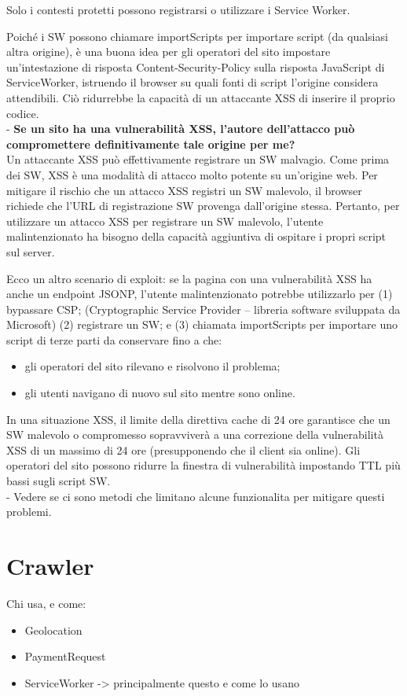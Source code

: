 \documentclass[italian]{article}
\begin{document}
\begin{itemize}
Solo i contesti protetti possono registrarsi o utilizzare i Service Worker.

Poiché i SW possono chiamare importScripts per importare script (da qualsiasi altra origine), è una buona idea per gli operatori del sito impostare un'intestazione di risposta Content-Security-Policy sulla risposta JavaScript di ServiceWorker, istruendo il browser su quali fonti di script l'origine considera attendibili. Ciò ridurrebbe la capacità di un attaccante XSS di inserire il proprio codice.
\\
-
\textbf{Se un sito ha una vulnerabilità XSS, l'autore dell'attacco può compromettere definitivamente tale origine per me?}
\\
Un attaccante XSS può effettivamente registrare un SW malvagio. Come prima dei SW, XSS è una modalità di attacco molto potente su un'origine web. Per mitigare il rischio che un attacco XSS registri un SW malevolo, il browser richiede che l'URL di registrazione SW provenga dall'origine stessa. Pertanto, per utilizzare un attacco XSS per registrare un SW malevolo, l'utente malintenzionato ha bisogno della capacità aggiuntiva di ospitare i propri script sul server.

Ecco un altro scenario di exploit: se la pagina con una vulnerabilità XSS ha anche un endpoint JSONP, l'utente malintenzionato potrebbe utilizzarlo per (1) bypassare CSP; (Cryptographic Service Provider – libreria software sviluppata da Microsoft) (2) registrare un SW; e (3) chiamata importScripts per importare uno script di terze parti da conservare fino a che:
\begin{itemize}
\item gli operatori del sito rilevano e risolvono il problema; 
\item gli utenti navigano di nuovo sul sito mentre sono online.
\end{itemize}
In una situazione XSS, il limite della direttiva cache di 24 ore garantisce che un SW malevolo o compromesso sopravviverà a una correzione della vulnerabilità XSS di un massimo di 24 ore (presupponendo che il client sia online). Gli operatori del sito possono ridurre la finestra di vulnerabilità impostando TTL più bassi sugli script SW.
\\
- Vedere se ci sono metodi che limitano alcune funzionalita per mitigare questi problemi.
\end{itemize}

\section{Crawler}
Chi usa, e come:
\begin{itemize}
\item Geolocation
\item PaymentRequest
\item ServiceWorker -> principalmente questo e come lo usano
\end{itemize}
\end{document}
